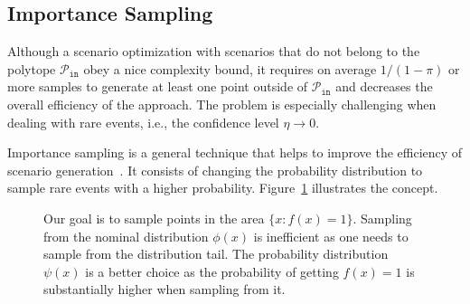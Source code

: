 \subsection{Importance Sampling}

Although a scenario optimization with scenarios that do not belong to the polytope $\mathcal{P}_{\texttt{in}}$ obey a nice complexity bound, it requires on average $1/(1-\pi)$ or more samples to generate at least one point outside of $\mathcal{P}_{\texttt{in}}$ and decreases the overall efficiency of the approach. The problem is especially challenging when dealing with rare events, i.e., the confidence level $\eta \to 0$. 

Importance sampling is a general technique that helps to improve the efficiency of scenario generation~\cite{tokdar2010importance}. It consists of changing the probability distribution to sample rare events with a higher probability. Figure~\ref{fig:20} illustrates the concept. 



\begin{figure}[ht]
  \centering

\caption{
  Our goal is to sample points in the area $\{x: f(x) = 1\}$. Sampling from the nominal distribution $\phi(x)$ is inefficient as one needs to sample from the distribution tail. The probability distribution $\psi(x)$ is a better choice as the probability of getting $f(x) = 1$ is substantially higher when sampling from it.}

  \label{fig:20}
\end{figure}

